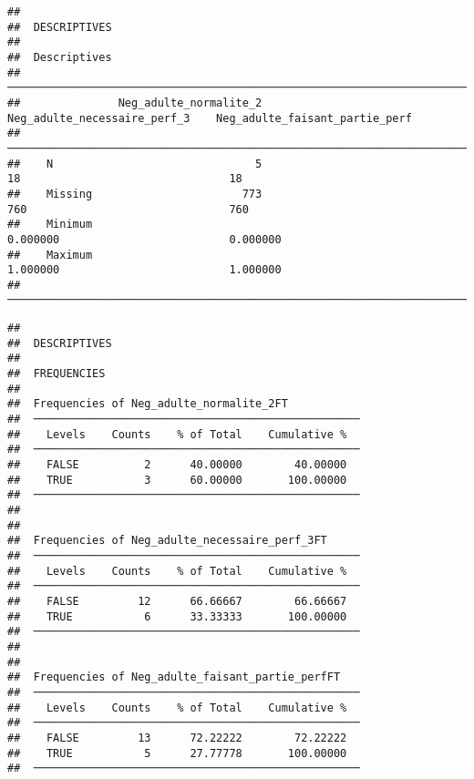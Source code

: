 \documentclass[
]{article}
\begin{document}
\begin{verbatim}
## 
##  DESCRIPTIVES
## 
##  Descriptives                                                                                            
##  ─────────────────────────────────────────────────────────────────────────────────────────────────────── 
##               Neg_adulte_normalite_2    Neg_adulte_necessaire_perf_3    Neg_adulte_faisant_partie_perf   
##  ─────────────────────────────────────────────────────────────────────────────────────────────────────── 
##    N                               5                              18                                18   
##    Missing                       773                             760                               760   
##    Minimum                                                  0.000000                          0.000000   
##    Maximum                                                  1.000000                          1.000000   
##  ───────────────────────────────────────────────────────────────────────────────────────────────────────
\end{verbatim}

\begin{verbatim}
## 
##  DESCRIPTIVES
## 
##  FREQUENCIES
## 
##  Frequencies of Neg_adulte_normalite_2FT            
##  ────────────────────────────────────────────────── 
##    Levels    Counts    % of Total    Cumulative %   
##  ────────────────────────────────────────────────── 
##    FALSE          2      40.00000        40.00000   
##    TRUE           3      60.00000       100.00000   
##  ────────────────────────────────────────────────── 
## 
## 
##  Frequencies of Neg_adulte_necessaire_perf_3FT      
##  ────────────────────────────────────────────────── 
##    Levels    Counts    % of Total    Cumulative %   
##  ────────────────────────────────────────────────── 
##    FALSE         12      66.66667        66.66667   
##    TRUE           6      33.33333       100.00000   
##  ────────────────────────────────────────────────── 
## 
## 
##  Frequencies of Neg_adulte_faisant_partie_perfFT    
##  ────────────────────────────────────────────────── 
##    Levels    Counts    % of Total    Cumulative %   
##  ────────────────────────────────────────────────── 
##    FALSE         13      72.22222        72.22222   
##    TRUE           5      27.77778       100.00000   
##  ──────────────────────────────────────────────────
\end{verbatim}
\end{document}
